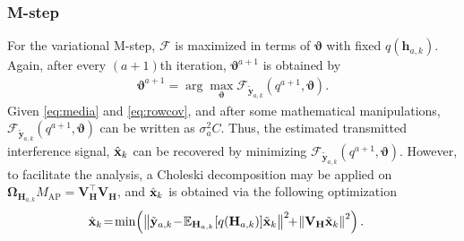 \documentclass[conference,twocolumn,a4paper]{IEEEtran}
\theoremstyle{remark} \newtheorem{remark}{Remark}
\begin{document}
\subsubsection{M-step}
For the variational $\mathrm{M}$-step, $\mathcal{F}$ is maximized in terms of $\mathbf{\vartheta}$ with fixed $q(\mathbf{h}_{a,k})$. Again, after every $(a\!+\!1)$th iteration, $\mathbf{\vartheta}^{a+1}$ is obtained by
\begin{align}
	\mathbf{\vartheta}^{a+1}=\arg \max _{\mathbf{\vartheta}} \mathcal{F}_{\tilde{\mathbf{y}}_{a,k}}\!\left(q^{a+1}, \mathbf{\vartheta}\right).
\end{align}
\vspace{0.5cm}
 Given \eqref{eq:media} and \eqref{eq:rowcov}, and after some mathematical manipulations,  $\mathcal{F}_{\tilde{\mathbf{y}}_{a,k}}\!\left(q^{a+1}, \mathbf{\vartheta}\right)$ can be written as $\sigma_{a}^2C.$
Thus, the estimated transmitted interference signal, $\Hat{\mathbf{x}}_{k}$  can be recovered by minimizing $\mathcal{F}_{\tilde{\mathbf{y}}_{a,k}}\!\left(q^{a+1}, \mathbf{\vartheta}\right)$. 
However, to facilitate the analysis, a Choleski decomposition may be applied on $\boldsymbol{\Omega}_{\mathbf{H}_{a,k}}  M_{\mathrm{AP}}=\mathbf{V}_{\mathbf{H}}^{\top} \mathbf{V}_{\mathbf{H}}$, and $\Hat{\mathbf{x}}_{k}$ is obtained via the following optimization
\begin{align}\label{eq:optimalx}
	\Hat{\mathbf{x}}_{k} & \!=\!\min\!\left(\left\|\tilde{\mathbf{y}}_{a,k}\!-\!\mathbb{E}_{\mathbf{H}_{a,k}}[q(\mathbf{H}_{a,k})] \tilde{\mathbf{x}}_{k}\right\|^{2}\!\!+\!\left\|\mathbf{V}_{\mathbf{H}} \tilde{\mathbf{x}}_{k}\right\|^{2}\right).
\end{align}
\end{document}
